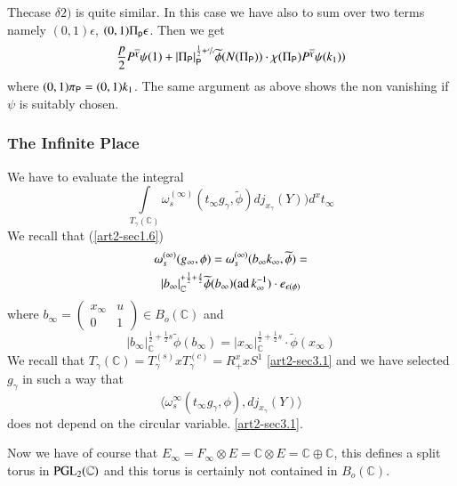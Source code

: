 \begin{itemize}
The\pageoriginale case $\delta 2)$ is quite similar. In this case we have also to sum over two terms namely $(0,1)\epsilon$, $(0,1)\Pi_{\mathsf{p}}\epsilon$. Then we get
$$
\frac{p}{2}P^{\overline{\chi}}\psi(1)+|\Pi_{\mathsf{P}}|^{\frac{1}{2}+\sfrac{s}{s}}_{\mathsf{P}}\widetilde{\phi}(N(\Pi_{\mathsf{P}}))\cdot \chi(\Pi_{\mathsf{P}})P^{\overline{\chi}}\psi(k_{1}))
$$
where $(0,1)\pi_{\mathsf{P}}=(0,1)k_{1}$. The same argument as above shows the non vanishing if $\psi$ is suitably chosen.
\end{itemize}

\subsubsection{The Infinite Place}\label{art2-sec3.1.5}
We have to evaluate the integral
$$
\int\limits_{T_{\gamma}(\mathbb{C})}\omega^{(\infty)}_{s}(t_{\infty}g_{\gamma},\widetilde{\phi})dj_{x_{\gamma}}(Y))d^{x}t_{\infty}
$$
We recall that (\ref{art2-sec1.6})
\begin{gather*}
\omega^{(\infty)}_{s}(g_{\infty},\phi)=\omega^{(\infty)}_{s}(b_{\infty}k_{\infty},\widetilde{\phi})=\\
|b_{\infty}|^{+\frac{1}{2}+\frac{s}{2}}_{\mathbb{C}}\widetilde{\phi}(b_{\infty})(\operatorname{ad} k^{-1}_{\infty})\cdot e_{\epsilon(\phi)}
\end{gather*}
where $b_{\infty}=\left(\begin{smallmatrix} x_{\infty} & u\\ 0 & 1\end{smallmatrix}\right)\in B_{o}(\mathbb{C})$ and
$$
|b_{\infty}|^{\frac{1}{2}+\frac{1}{2}s}_{\mathbb{C}}\widetilde{\phi}(b_{\infty})=|x_{\infty}|_{\mathbb{C}}^{\frac{1}{2}+\frac{1}{2}s}\cdot \widetilde{\phi}(x_{\infty})
$$
We recall that $T_{\gamma}(\mathbb{C})=T^{(s)}_{\gamma} xT^{(c)}_{\gamma}=R^{x}_{+}xS^{1}$ \eqref{art2-sec3.1} and we have selected $g_{\gamma}$ in such a way that
$$
\langle \omega^{\infty}_{s}(t_{\infty}g_{\gamma},\phi),dj_{x_{\gamma}}(Y)\rangle
$$
does not depend on the circular variable. \eqref{art2-sec3.1}.

Now we have of course that $E_{\infty}=F_{\infty}\otimes E=\mathbb{C}\otimes E=\mathbb{C}\oplus \mathbb{C}$, this defines a split torus in $\mathrm{PGL}_{2}(\mathbb{C})$ and this torus is certainly not contained in $B_{o}(\mathbb{C})$.

